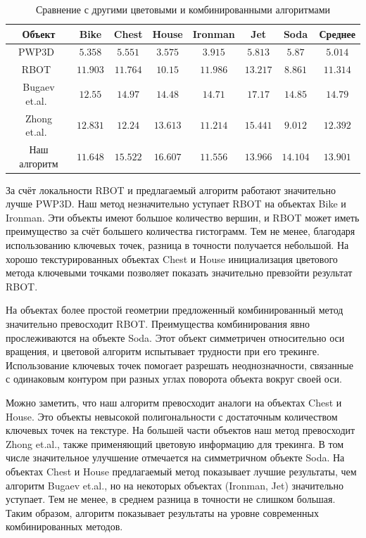 \begin{table}[h]
\caption{\label{tab:analogues}Сравнение с другими цветовыми и комбинированными
алгоритмами}
\begin{center}
\begin{tabular}{|c|c|c|c|c|c|c|c|}
\hline
Объект & Bike & Chest & House & Ironman & Jet & Soda & Среднее \\
\hline
PWP3D~\cite{PWP3D} & $5.358$ & $5.551$ & $3.575$ &
$3.915$ & $5.813$ & $5.87$ & $5.014$ \\
\hline
RBOT~\cite{Tjaden2018} & $11.903$ & $11.764$ & $10.15$ &
$11.986$ & $13.217$ & $8.861$ & $11.314$ \\
\hline
Bugaev et.al.~\cite{Bugaev_2018_ECCV} & $12.55$ & $14.97$ & $14.48$ &
$\mathbf{14.71}$ & $\mathbf{17.17}$ & $\mathbf{14.85}$ & $\mathbf{14.79}$ \\
\hline
Zhong et.al.~\cite{Zhong2020} & $\mathbf{12.831}$ & $12.24$ & $13.613$ &
$11.214$ & $15.441$ & $9.012$ & $12.392$ \\
\hline
Наш алгоритм & $11.648$ & $\mathbf{15.522}$ & $\mathbf{16.607}$ & $11.556$ &
$13.966$ & $14.104$
& $13.901$ \\
\hline
\end{tabular}
\end{center}
\end{table}


За счёт локальности RBOT и предлагаемый алгоритм работают значительно лучше PWP3D. 
Наш метод незначительно уступает RBOT на объектах Bike и Ironman. Эти объекты
имеют большое количество вершин, и RBOT может иметь преимущество за счёт
большего количества гистограмм. Тем не менее, благодаря использованию ключевых
точек, разница в точности получается небольшой. На хорошо текстурированных
объектах Chest и House инициализация цветового метода ключевыми точками
позволяет показать значительно превзойти результат RBOT.

На объектах более простой геометрии предложенный комбинированный метод
значительно превосходит RBOT.
Преимущества комбинирования явно прослеживаются на объекте Soda. 
Этот объект симметричен относительно оси вращения, и цветовой алгоритм
испытывает трудности при его трекинге.
Использование ключевых точек помогает разрешать неоднозначности, связанные с
одинаковым контуром при разных углах поворота объекта вокруг своей оси.

Можно заметить, что наш алгоритм превосходит аналоги на объектах Chest и House.
Это объекты невысокой полигональности с достаточным количеством ключевых точек
на текстуре.
На большей части объектов наш метод превосходит Zhong et.al., также применяющий
цветовую информацию для трекинга.
В том числе значительное улучшение отмечается на симметричном объекте Soda.
На объектах Chest и House предлагаемый метод показывает лучшие результаты, чем
алгоритм Bugaev et.al., но на некоторых объектах (Ironman, Jet) значительно
уступает.
Тем не менее, в среднем разница в точности не слишком большая.
Таким образом, алгоритм показывает результаты на уровне современных
комбинированных методов.

